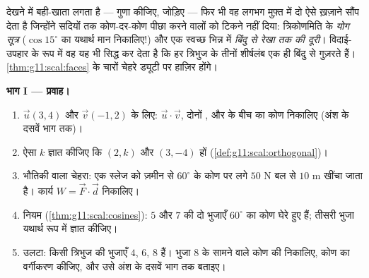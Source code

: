 \begin{problem}
\label{pb:g11:scal:1}
 देखने में बही-खाता लगता है --- गुणा कीजिए, जोड़िए --- फिर भी वह
लगभग मुफ़्त में दो ऐसे ख़ज़ाने सौंप देता है जिन्होंने सदियों तक कोण-दर-कोण
पीछा करने वालों को टिकने नहीं दिया: त्रिकोणमिति के \emph{योग सूत्र} ($\cos 15^\circ$
का यथार्थ मान निकालिए!) और एक स्वच्छ भिन्न में \emph{बिंदु से रेखा तक की
दूरी}। विदाई-उपहार के रूप में वह यह भी सिद्ध कर देता है कि हर त्रिभुज के
तीनों शीर्षलंब एक ही बिंदु से गुज़रते हैं। \cref{thm:g11:scal:faces} के चारों चेहरे ड्यूटी पर
हाज़िर होंगे।

\medskip
\noindent\textbf{भाग I --- प्रवाह।}
\begin{enumerate}
  \item $\vec u(3, 4)$ और $\vec v(-1, 2)$ के लिए: $\vec u \cdot \vec v$, दोनों , और  के बीच का
        कोण निकालिए (अंश के दसवें भाग तक)।
  \item ऐसा $k$ ज्ञात कीजिए कि $(2, k)$ और $(3, -4)$  हों (\cref{def:g11:scal:orthogonal})।
  \item भौतिकी वाला चेहरा: एक स्लेज को ज़मीन से $60^\circ$ के कोण पर लगे $50$
        N बल से $10$ m खींचा जाता है। कार्य $W = \vec F \cdot \vec d$ निकालिए।
  \item {} नियम (\cref{thm:g11:scal:cosines}): $5$ और $7$ की दो भुजाएँ $60^\circ$ का कोण घेरे
        हुए हैं; तीसरी भुजा यथार्थ रूप में ज्ञात कीजिए।
  \item उलटा: किसी त्रिभुज की भुजाएँ $4$, $6$, $8$ हैं। भुजा $8$ के
        सामने वाले कोण की  निकालिए, कोण का वर्गीकरण कीजिए, और उसे अंश
        के दसवें भाग तक बताइए।
\end{enumerate}


\end{problem}
